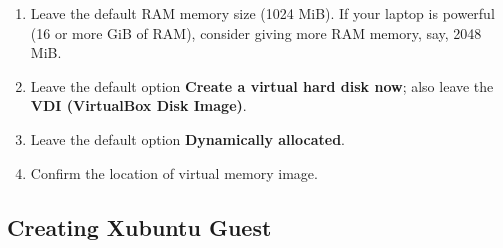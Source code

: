 \documentclass[11pt,a4paper]{article}
\begin{document}
\begin{enumerate}
\item Leave the default RAM memory size (1024 MiB). If your laptop is powerful (16 or more GiB of RAM), 
consider giving more RAM memory, say, 2048 MiB.
\item Leave the default option {\bf Create a virtual hard disk now}; also leave the {\bf VDI (VirtualBox Disk Image)}. 
\item Leave the default option {\bf Dynamically allocated}. 
\item Confirm the location of virtual memory image.\\[6pt]
\end{enumerate}



\subsection{Creating Xubuntu Guest}
\end{document}
